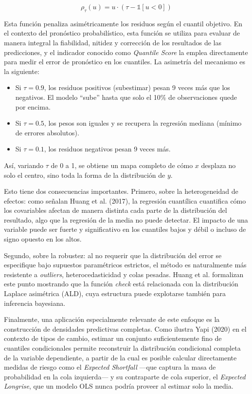 ﻿\documentclass[11pt,a4paper]{article}
\begin{document}
\[
\rho_\tau(u)=u\cdot(\tau-\mathbb{1}[u<0])
\]

Esta función penaliza asimétricamente los residuos según el cuantil objetivo. En el contexto del pronóstico probabilístico, esta función se utiliza para evaluar de manera integral la fiabilidad, nitidez y corrección de los resultados de las predicciones, y el indicador conocido como \textit{Quantile Score} la emplea directamente para medir el error de pronóstico en los cuantiles. La asimetría del mecanismo es la siguiente:

\begin{itemize}
    \item Si $\tau=0.9$, los residuos positivos (subestimar) pesan 9 veces más que los negativos. El modelo “sube” hasta que solo el 10\% de observaciones quede por encima.
    
    \item Si $\tau=0.5$, los pesos son iguales y se recupera la regresión mediana (mínimo de errores absolutos).
    
    \item Si $\tau=0.1$, los residuos negativos pesan 9 veces más.
\end{itemize}

Así, variando $\tau$ de 0 a 1, se obtiene un mapa completo de cómo $x$ desplaza no solo el centro, sino toda la forma de la distribución de $y$.

Esto tiene dos consecuencias importantes. Primero, sobre la heterogeneidad de efectos: como señalan Huang et al. (2017), la regresión cuantílica cuantifica cómo los covariables afectan de manera distinta cada parte de la distribución del resultado, algo que la regresión de la media no puede detectar. El impacto de una variable puede ser fuerte y significativo en los cuantiles bajos y débil o incluso de signo opuesto en los altos. 

Segundo, sobre la robustez: al no requerir que la distribución del error se especifique bajo supuestos paramétricos estrictos, el método es naturalmente más resistente a \textit{outliers}, heterocedasticidad y colas pesadas. Huang et al. formalizan este punto mostrando que la función \textit{check} está relacionada con la distribución Laplace asimétrica (ALD), cuya estructura puede explotarse también para inferencia bayesiana.

Finalmente, una aplicación especialmente relevante de este enfoque es la construcción de densidades predictivas completas. Como ilustra Yapi (2020) en el contexto de tipos de cambio, estimar un conjunto suficientemente fino de cuantiles condicionales permite reconstruir la distribución condicional completa de la variable dependiente, a partir de la cual es posible calcular directamente medidas de riesgo como el \textit{Expected Shortfall} —que captura la masa de probabilidad en la cola izquierda— y su contraparte de cola superior, el \textit{Expected Longrise}, que un modelo OLS nunca podría proveer al estimar solo la media.
\end{document}
